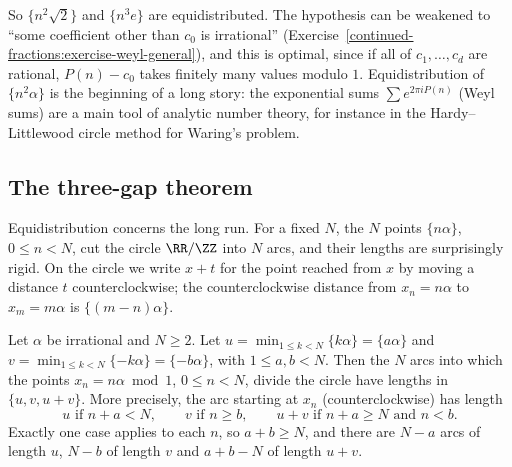 So $\{n^2\sqrt2\}$ and $\{n^3e\}$ are equidistributed. The hypothesis can be weakened to ``some coefficient other than $c_0$ is irrational'' (Exercise~\ref{continued-fractions:exercise-weyl-general}),
and this is optimal, since if all of $c_1, \ldots, c_d$ are rational, $P(n) - c_0$ takes finitely many values modulo $1$. Equidistribution of $\{n^2\alpha\}$ is the beginning of a long story: the
exponential sums $\sum e^{2\pi iP(n)}$ (Weyl sums) are a main tool of analytic number theory, for instance in the Hardy--Littlewood circle method for Waring's problem.

\subsection{The three-gap theorem}\label{continued-fractions:subsection-three-gap}

Equidistribution concerns the long run. For a fixed $N$, the $N$ points $\{n\alpha\}$, $0 \leq n < N$, cut the circle $\RR/\ZZ$ into $N$ arcs, and their lengths are surprisingly rigid. On the circle we
write $x + t$ for the point reached from $x$ by moving a distance $t$ counterclockwise; the counterclockwise distance from $x_n = n\alpha$ to $x_m = m\alpha$ is $\{(m - n)\alpha\}$.

\begin{theorem}\label{continued-fractions:theorem-three-gap}
Let $\alpha$ be irrational and $N \geq 2$. Let $u = \min_{1 \leq k < N}\{k\alpha\} = \{a\alpha\}$ and $v = \min_{1 \leq k < N}\{-k\alpha\} = \{-b\alpha\}$, with $1 \leq a, b < N$. Then the $N$ arcs into
which the points $x_n = n\alpha \bmod 1$, $0 \leq n < N$, divide the circle have lengths in $\{u, v, u + v\}$. More precisely, the arc starting at $x_n$ (counterclockwise) has length
\[
u \text{ if } n + a < N, \qquad v \text{ if } n \geq b, \qquad u + v \text{ if } n + a \geq N \text{ and } n < b.
\]
Exactly one case applies to each $n$, so $a + b \geq N$, and there are $N - a$ arcs of length $u$, $N - b$ of length $v$ and $a + b - N$ of length $u + v$.
\end{theorem}

